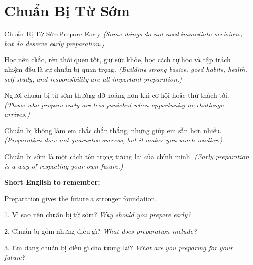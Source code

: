 \section{Chuẩn Bị Từ Sớm}
\begin{truyen}{Chuẩn Bị Từ Sớm}{Prepare Early}
\textit{(Some things do not need immediate decisions, but do deserve early preparation.)}

Học nền chắc, rèn thói quen tốt, giữ sức khỏe, học cách tự học và tập trách nhiệm đều là sự chuẩn bị quan trọng.
\textit{(Building strong basics, good habits, health, self-study, and responsibility are all important preparation.)}

Người chuẩn bị từ sớm thường đỡ hoảng hơn khi cơ hội hoặc thử thách tới.
\textit{(Those who prepare early are less panicked when opportunity or challenge arrives.)}

Chuẩn bị không làm em chắc chắn thắng, nhưng giúp em sẵn hơn nhiều.
\textit{(Preparation does not guarantee success, but it makes you much readier.)}
\end{truyen}

\begin{baihoc}
Chuẩn bị sớm là một cách tôn trọng tương lai của chính mình.
\textit{(Early preparation is a way of respecting your own future.)}
\end{baihoc}

\begin{ghinhoanh}
\textbf{Short English to remember:}

Preparation gives the future a stronger foundation.

\end{ghinhoanh}

\begin{tuhocnhanh}
1. Vì sao nên chuẩn bị từ sớm? \textit{Why should you prepare early?}

2. Chuẩn bị gồm những điều gì? \textit{What does preparation include?}

3. Em đang chuẩn bị điều gì cho tương lai? \textit{What are you preparing for your future?}
\end{tuhocnhanh}
\ngancach

